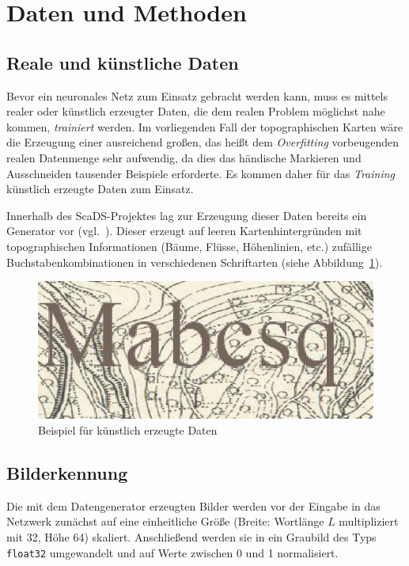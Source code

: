 \section{Daten und Methoden}
\label{daten}

\subsection{Reale und künstliche Daten}
\label{daten:daten}

Bevor ein neuronales Netz zum Einsatz gebracht werden kann, muss es mittels realer oder künstlich erzeugter Daten, die
dem realen Problem möglichst nahe kommen, \textit{trainiert} werden. Im vorliegenden Fall der topographischen Karten
wäre die Erzeugung einer ausreichend großen, das heißt dem \textit{Overfitting} vorbeugenden realen Datenmenge sehr
aufwendig, da dies das händische Markieren und Ausschneiden tausender Beispiele erforderte. Es kommen daher für das
\textit{Training} künstlich erzeugte Daten zum Einsatz.

Innerhalb des ScaDS-Projektes lag zur Erzeugung dieser Daten bereits ein Generator vor (vgl.~\cite{schoelzel17}). Dieser
erzeugt auf leeren Kartenhintergründen mit topographischen Informationen (Bäume, Flüsse, Höhenlinien, etc.) zufällige
Buchstabenkombinationen in verschiedenen Schriftarten (siehe Abbildung~\ref{daten:daten:beispiele}).

\begin{figure}
    \centering
    \includegraphics[width = 0.9\linewidth]{img/Mabcsq.jpg}
    \caption{Beispiel für künstlich erzeugte Daten\label{daten:daten:beispiele}}
\end{figure}

\subsection{Bilderkennung}
\label{daten:bilderkennung}

Die mit dem Datengenerator erzeugten Bilder werden vor der Eingabe in das Netzwerk zunächst auf eine einheitliche
Größe (Breite: Wortlänge $L$ multipliziert mit 32, Höhe 64) skaliert. Anschließend werden sie in ein Graubild des
Typs \texttt{float32} umgewandelt und auf Werte zwischen 0 und 1 normalisiert.

